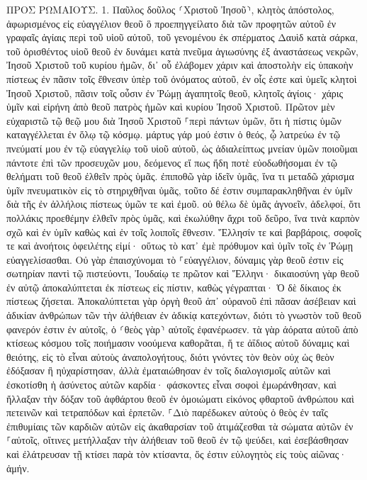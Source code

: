 \documentclass[twoside, 9pt]{extreport}
\begin{document}
ΠΡΟΣ ΡΩΜΑΙΟΥΣ.
1.
Παῦλος δοῦλος ⸂Χριστοῦ Ἰησοῦ⸃, κλητὸς ἀπόστολος, ἀφωρισμένος εἰς εὐαγγέλιον θεοῦ 
ὃ προεπηγγείλατο διὰ τῶν προφητῶν αὐτοῦ ἐν γραφαῖς ἁγίαις 
περὶ τοῦ υἱοῦ αὐτοῦ, τοῦ γενομένου ἐκ σπέρματος Δαυὶδ κατὰ σάρκα, 
τοῦ ὁρισθέντος υἱοῦ θεοῦ ἐν δυνάμει κατὰ πνεῦμα ἁγιωσύνης ἐξ ἀναστάσεως νεκρῶν, Ἰησοῦ Χριστοῦ τοῦ κυρίου ἡμῶν, 
δι᾽ οὗ ἐλάβομεν χάριν καὶ ἀποστολὴν εἰς ὑπακοὴν πίστεως ἐν πᾶσιν τοῖς ἔθνεσιν ὑπὲρ τοῦ ὀνόματος αὐτοῦ, 
ἐν οἷς ἐστε καὶ ὑμεῖς κλητοὶ Ἰησοῦ Χριστοῦ, 
πᾶσιν τοῖς οὖσιν ἐν Ῥώμῃ ἀγαπητοῖς θεοῦ, κλητοῖς ἁγίοις· χάρις ὑμῖν καὶ εἰρήνη ἀπὸ θεοῦ πατρὸς ἡμῶν καὶ κυρίου Ἰησοῦ Χριστοῦ. 
Πρῶτον μὲν εὐχαριστῶ τῷ θεῷ μου διὰ Ἰησοῦ Χριστοῦ ⸀περὶ πάντων ὑμῶν, ὅτι ἡ πίστις ὑμῶν καταγγέλλεται ἐν ὅλῳ τῷ κόσμῳ. 
μάρτυς γάρ μού ἐστιν ὁ θεός, ᾧ λατρεύω ἐν τῷ πνεύματί μου ἐν τῷ εὐαγγελίῳ τοῦ υἱοῦ αὐτοῦ, ὡς ἀδιαλείπτως μνείαν ὑμῶν ποιοῦμαι 
πάντοτε ἐπὶ τῶν προσευχῶν μου, δεόμενος εἴ πως ἤδη ποτὲ εὐοδωθήσομαι ἐν τῷ θελήματι τοῦ θεοῦ ἐλθεῖν πρὸς ὑμᾶς. 
ἐπιποθῶ γὰρ ἰδεῖν ὑμᾶς, ἵνα τι μεταδῶ χάρισμα ὑμῖν πνευματικὸν εἰς τὸ στηριχθῆναι ὑμᾶς, 
τοῦτο δέ ἐστιν συμπαρακληθῆναι ἐν ὑμῖν διὰ τῆς ἐν ἀλλήλοις πίστεως ὑμῶν τε καὶ ἐμοῦ. 
οὐ θέλω δὲ ὑμᾶς ἀγνοεῖν, ἀδελφοί, ὅτι πολλάκις προεθέμην ἐλθεῖν πρὸς ὑμᾶς, καὶ ἐκωλύθην ἄχρι τοῦ δεῦρο, ἵνα τινὰ καρπὸν σχῶ καὶ ἐν ὑμῖν καθὼς καὶ ἐν τοῖς λοιποῖς ἔθνεσιν. 
Ἕλλησίν τε καὶ βαρβάροις, σοφοῖς τε καὶ ἀνοήτοις ὀφειλέτης εἰμί· 
οὕτως τὸ κατ᾽ ἐμὲ πρόθυμον καὶ ὑμῖν τοῖς ἐν Ῥώμῃ εὐαγγελίσασθαι. 
Οὐ γὰρ ἐπαισχύνομαι τὸ ⸀εὐαγγέλιον, δύναμις γὰρ θεοῦ ἐστιν εἰς σωτηρίαν παντὶ τῷ πιστεύοντι, Ἰουδαίῳ τε πρῶτον καὶ Ἕλληνι· 
δικαιοσύνη γὰρ θεοῦ ἐν αὐτῷ ἀποκαλύπτεται ἐκ πίστεως εἰς πίστιν, καθὼς γέγραπται· Ὁ δὲ δίκαιος ἐκ πίστεως ζήσεται. 
Ἀποκαλύπτεται γὰρ ὀργὴ θεοῦ ἀπ᾽ οὐρανοῦ ἐπὶ πᾶσαν ἀσέβειαν καὶ ἀδικίαν ἀνθρώπων τῶν τὴν ἀλήθειαν ἐν ἀδικίᾳ κατεχόντων, 
διότι τὸ γνωστὸν τοῦ θεοῦ φανερόν ἐστιν ἐν αὐτοῖς, ὁ ⸂θεὸς γὰρ⸃ αὐτοῖς ἐφανέρωσεν. 
τὰ γὰρ ἀόρατα αὐτοῦ ἀπὸ κτίσεως κόσμου τοῖς ποιήμασιν νοούμενα καθορᾶται, ἥ τε ἀΐδιος αὐτοῦ δύναμις καὶ θειότης, εἰς τὸ εἶναι αὐτοὺς ἀναπολογήτους, 
διότι γνόντες τὸν θεὸν οὐχ ὡς θεὸν ἐδόξασαν ἢ ηὐχαρίστησαν, ἀλλὰ ἐματαιώθησαν ἐν τοῖς διαλογισμοῖς αὐτῶν καὶ ἐσκοτίσθη ἡ ἀσύνετος αὐτῶν καρδία· 
φάσκοντες εἶναι σοφοὶ ἐμωράνθησαν, 
καὶ ἤλλαξαν τὴν δόξαν τοῦ ἀφθάρτου θεοῦ ἐν ὁμοιώματι εἰκόνος φθαρτοῦ ἀνθρώπου καὶ πετεινῶν καὶ τετραπόδων καὶ ἑρπετῶν. 
⸀Διὸ παρέδωκεν αὐτοὺς ὁ θεὸς ἐν ταῖς ἐπιθυμίαις τῶν καρδιῶν αὐτῶν εἰς ἀκαθαρσίαν τοῦ ἀτιμάζεσθαι τὰ σώματα αὐτῶν ἐν ⸀αὐτοῖς, 
οἵτινες μετήλλαξαν τὴν ἀλήθειαν τοῦ θεοῦ ἐν τῷ ψεύδει, καὶ ἐσεβάσθησαν καὶ ἐλάτρευσαν τῇ κτίσει παρὰ τὸν κτίσαντα, ὅς ἐστιν εὐλογητὸς εἰς τοὺς αἰῶνας· ἀμήν. 
\end{document}
